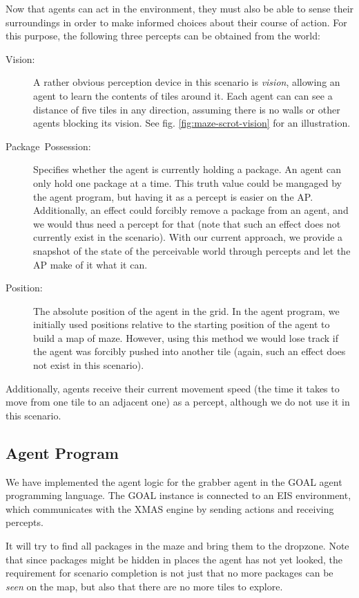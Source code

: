Now that agents can act in the environment, they must also be able
to sense their surroundings in order to make informed choices about
their course of action. For this purpose, the following three percepts
can be obtained from the world:
\begin{description}
\item [{Vision:}] A rather obvious perception device in this scenario is
\emph{vision}, allowing an agent to learn the contents of tiles around
it. Each agent can can see a distance of five tiles in any direction,
assuming there is no walls or other agents blocking its vision. See
fig. \ref{fig:maze-scrot-vision} for an illustration.
\item [{Package~Possession:}] Specifies whether the agent is currently
holding a package. An agent can only hold one package at a time. This
truth value could be mangaged by the agent program, but having it
as a percept is easier on the AP. Additionally, an effect could forcibly
remove a package from an agent, and we would thus need a percept for
that (note that such an effect does not currently exist in the scenario).
With our current approach, we provide a snapshot of the state of the
perceivable world through percepts and let the AP make of it what
it can.
\item [{Position:}] The absolute position of the agent in the grid. In
the agent program, we initially used positions relative to the starting
position of the agent to build a map of maze. However, using this
method we would lose track if the agent was forcibly pushed into another
tile (again, such an effect does not exist in this scenario).
\end{description}
Additionally, agents receive their current movement speed (the time
it takes to move from one tile to an adjacent one) as a percept, although
we do not use it in this scenario.


\subsection*{Agent Program}

We have implemented the agent logic for the grabber agent in the GOAL
agent programming language. The GOAL instance is connected to an EIS
environment, which communicates with the XMAS engine by sending actions
and receiving percepts.

It will try to find all packages in the maze and bring them to the
dropzone. Note that since packages might be hidden in places the agent
has not yet looked, the requirement for scenario completion is not
just that no more packages can be \emph{seen }on the map, but also
that there are no more tiles to explore.


